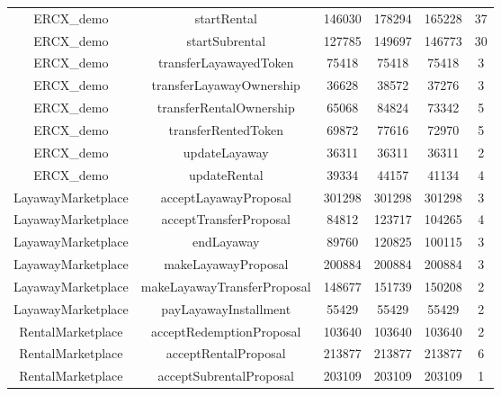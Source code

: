 \documentclass[english, LaM, oneside]{sapthesis}%
\begin{document}
\begin{table}
\begin{adjustbox}{width=0.75\textwidth}
\begin{tabular}{@{}cccccc@{}}
ERCX\_demo               & startRental                  & 146030       & 178294       & 165228       & 37               \\
ERCX\_demo               & startSubrental               & 127785       & 149697       & 146773       & 30               \\
ERCX\_demo               & transferLayawayedToken       & 75418        & 75418        & 75418        & 3                \\
ERCX\_demo               & transferLayawayOwnership     & 36628        & 38572        & 37276        & 3                \\
ERCX\_demo               & transferRentalOwnership      & 65068        & 84824        & 73342        & 5                \\
ERCX\_demo               & transferRentedToken          & 69872        & 77616        & 72970        & 5                \\
ERCX\_demo               & updateLayaway                & 36311        & 36311        & 36311        & 2                \\
ERCX\_demo               & updateRental                 & 39334        & 44157        & 41134        & 4                \\
LayawayMarketplace & acceptLayawayProposal        & 301298       & 301298       & 301298       & 3                \\
LayawayMarketplace & acceptTransferProposal       & 84812        & 123717       & 104265       & 4                \\
LayawayMarketplace & endLayaway                   & 89760        & 120825       & 100115       & 3                \\
LayawayMarketplace & makeLayawayProposal          & 200884       & 200884       & 200884       & 3                \\
LayawayMarketplace & makeLayawayTransferProposal  & 148677       & 151739       & 150208       & 2                \\
LayawayMarketplace & payLayawayInstallment        & 55429        & 55429        & 55429        & 2                \\
RentalMarketplace  & acceptRedemptionProposal     & 103640       & 103640       & 103640       & 2                \\
RentalMarketplace  & acceptRentalProposal         & 213877       & 213877       & 213877       & 6                \\
RentalMarketplace  & acceptSubrentalProposal      & 203109       & 203109       & 203109       & 1                \\

\end{tabular}
\end{adjustbox}
\end{table}
\end{document}

